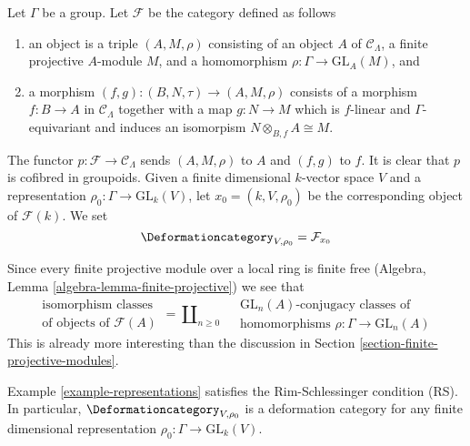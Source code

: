 \begin{example}
\label{example-representations}
Let $\Gamma$ be a group.
Let $\mathcal{F}$ be the category defined as follows
\begin{enumerate}
\item an object is a triple $(A, M, \rho)$ consisting of an
object $A$ of $\mathcal{C}_\Lambda$, a finite projective $A$-module $M$,
and a homomorphism $\rho : \Gamma \to \text{GL}_A(M)$, and
\item a morphism $(f, g) : (B, N, \tau) \to (A, M, \rho)$ consists of
a morphism $f : B \to A$ in $\mathcal{C}_\Lambda$ together
with a map $g : N \to M$ which is $f$-linear and $\Gamma$-equivariant
and induces an isomorpism $N \otimes_{B, f} A \cong M$.
\end{enumerate}
The functor $p : \mathcal{F} \to \mathcal{C}_\Lambda$ sends $(A, M, \rho)$
to $A$ and $(f, g)$ to $f$. It is clear that $p$ is cofibred in groupoids.
Given a finite dimensional $k$-vector space $V$ and a representation
$\rho_0 : \Gamma \to \text{GL}_k(V)$,
let $x_0 = (k, V, \rho_0)$ be the corresponding object of $\mathcal{F}(k)$.
We set
$$
\Deformationcategory_{V, \rho_0} = \mathcal{F}_{x_0}
$$
\end{example}

\noindent
Since every finite projective module over a local ring is finite free
(Algebra, Lemma \ref{algebra-lemma-finite-projective})
we see that
$$
\begin{matrix}
\text{isomorphism classes} \\
\text{of objects of }\mathcal{F}(A)
\end{matrix}
=
\coprod\nolimits_{n \geq 0}\quad
\begin{matrix}
\text{GL}_n(A)\text{-conjugacy classes of}\\
\text{homomorphisms }\rho : \Gamma \to \text{GL}_n(A)
\end{matrix}
$$
This is already more interesting than the discussion in
Section \ref{section-finite-projective-modules}.

\begin{lemma}
\label{lemma-representations-RS}
Example \ref{example-representations}
satisfies the Rim-Schlessinger condition (RS).
In particular, $\Deformationcategory_{V, \rho_0}$ is a deformation category
for any finite dimensional representation
$\rho_0 : \Gamma \to \text{GL}_k(V)$.
\end{lemma}

